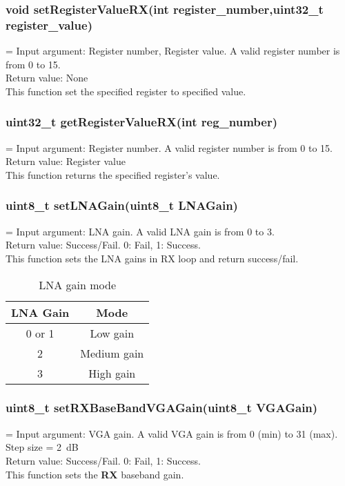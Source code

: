 \subsubsection{void setRegisterValueRX(int register\_number,uint32\_t register\_value)}
\hangindent=\parindent
{}
Input argument: Register number, Register value. A valid register number is from 0 to 15.\\
Return value: None\\
This function set the specified register to specified value.

\subsubsection{uint32\_t getRegisterValueRX(int reg\_number)}
\hangindent=\parindent
{}
Input argument: Register number. A valid register number is from 0 to 15.\\
Return value: Register value\\
This function returns the specified register's value.

\subsubsection{uint8\_t setLNAGain(uint8\_t LNAGain)}
\hangindent=\parindent
{}
Input argument: LNA gain. A valid LNA gain is from 0 to 3.\\
Return value: Success/Fail. 0: Fail, 1: Success.\\
This function sets the LNA gains in RX loop and return success/fail.
\begin{table}
\centering
	\begin{tabular}{|c|c|}
		\hline
		{\bf LNA Gain} & {\bf Mode}\\ \hline
		0 or 1 & Low gain\\ \hline
		2 & Medium gain\\ \hline
		3 & High gain\\ \hline
	\end{tabular}
	\caption{LNA gain mode}
\end{table}

\subsubsection{uint8\_t setRXBaseBandVGAGain(uint8\_t VGAGain)}
\hangindent=\parindent
{}
Input argument: VGA gain. A valid VGA gain is from 0 (min) to 31 (max). Step size = 2~dB\\
Return value: Success/Fail. 0: Fail, 1: Success.\\
This function sets the {\bf RX} baseband gain.


